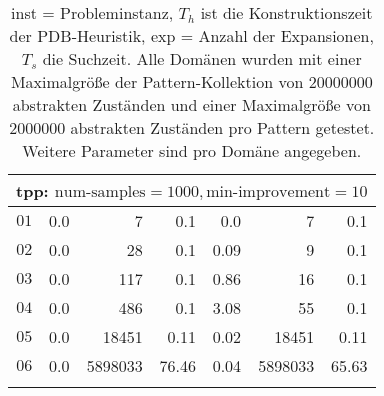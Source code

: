 \begin{longtable}{|c||r|r|r||r|r|r|}
\multicolumn{7}{|l|}{tpp: $\text{num-samples}=1000,\text{min-improvement}=10$}\\\hline
$01$ & 0.0 & 7 & 0.1 &0.0 & 7 & 0.1 \\\hline
$02$ & 0.0 & 28 & 0.1 &0.09 & 9 & 0.1 \\\hline
$03$ & 0.0 & 117 & 0.1 &0.86 & 16 & 0.1 \\\hline
$04$ & 0.0 & 486 & 0.1 &3.08 & 55 & 0.1 \\\hline
$05$ & 0.0 & 18451 & 0.11 &0.02 & 18451 & 0.11 \\\hline
$06$ & 0.0 & 5898033 & 76.46 &0.04 & 5898033 & 65.63 \\\hline

\caption{inst = Probleminstanz, $T_h$ ist die Konstruktionszeit der PDB-Heuristik, exp = Anzahl der Expansionen, $T_s$
die Suchzeit. Alle Domänen wurden mit einer Maximalgröße der Pattern-Kollektion von $20000000$ abstrakten Zuständen und
einer Maximalgröße von $2000000$ abstrakten Zuständen pro Pattern getestet. Weitere Parameter sind pro Domäne angegeben.}
\end{longtable}